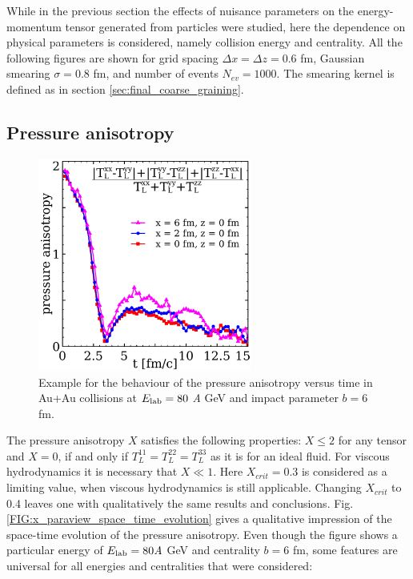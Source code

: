 While in the previous section the effects of nuisance parameters on
the energy-momentum tensor generated from particles were studied, here the
dependence on physical parameters is considered, namely collision energy and centrality.
All the following figures are shown for grid spacing $\Delta x = \Delta z = 0.6$ fm,
Gaussian smearing $\sigma = 0.8$ fm, and number of events $N_{ev} = 1000$.
The smearing kernel is defined as in section \ref{sec:final_coarse_graining}.

\subsection{Pressure anisotropy}

\begin{figure}
  \includegraphics[width = 7cm]{plots/thermalization_urqmd/E80b6_x_vs_t_few_space_points.pdf}
  \caption{Example for the behaviour of the pressure anisotropy versus time in Au+Au
           collisions at $E_\mathrm{lab} = 80$ \emph{A} GeV and impact parameter $b = 6$ fm.}
  \label{FIG:x_vs_t_few_space_points}
\end{figure}

The pressure anisotropy $X$ satisfies the following properties: $X \le 2$ for
any tensor and $X = 0$, if and only if $T^{11}_L = T^{22}_L = T^{33}_L$ as it is
for an ideal fluid. For viscous hydrodynamics it is necessary that $X \ll
1$. Here $X_{crit} = 0.3$ is considered as a limiting value, when viscous
hydrodynamics is still applicable. Changing $X_{crit}$ to 0.4 leaves one with
qualitatively the same results and conclusions. Fig.
\ref{FIG:x_paraview_space_time_evolution} gives a qualitative impression of the
space-time evolution of the pressure anisotropy. Even though the figure shows a
particular energy of $E_\mathrm{lab} = 80\emph{A}$ GeV and centrality $b = 6$ fm, some
features are universal for all energies and centralities that were considered:


